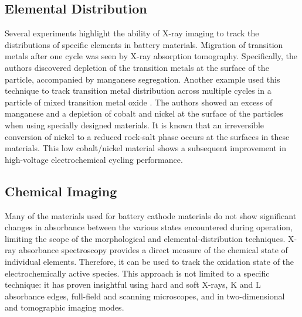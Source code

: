 \documentclass[journal=cmatex,manuscript=perspective]{achemso}
\begin{document}
\subsection{Elemental Distribution}
Several experiments highlight the ability of X-ray imaging to track
the distributions of specific elements in battery materials. Migration
of transition metals after one cycle was seen by X-ray absorption
tomography\cite{yang2014-2}. Specifically, the authors discovered
depletion of the transition metals at the surface of the particle,
accompanied by manganese segregation. Another example used this
technique to track transition metal distribution across multiple
cycles in a particle of mixed transition metal oxide
\cite{lin2016}. The authors showed
an excess of manganese and a depletion of cobalt and nickel at the
surface of the particles when using specially designed materials. It
is known that an irreversible conversion of nickel to a reduced
rock-salt phase occurs at the surfaces in these materials. This low
cobalt/nickel material shows a subsequent improvement in high-voltage
electrochemical cycling performance.

\subsection{Chemical Imaging}

Many of the materials used for battery cathode materials do not show
significant changes in absorbance between the various states
encountered during operation, limiting the scope of the morphological
and elemental-distribution techniques. X-ray absorbance spectroscopy
provides a direct measure of the chemical state of individual
elements. Therefore, it can be used to track the oxidation state of
the electrochemically active species. This approach is not limited to
a specific technique: it has proven insightful using hard and soft
X-rays, K and L absorbance edges, full-field and scanning microscopes,
and in two-dimensional and tomographic imaging modes.
\end{document}
